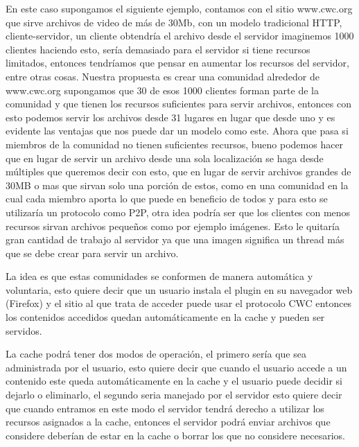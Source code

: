 En este caso supongamos el siguiente ejemplo, contamos con el sitio www.cwc.org que sirve archivos de video de más de 30Mb, con un modelo tradicional HTTP, cliente-servidor, un cliente obtendría el archivo desde el servidor  imaginemos 1000 clientes haciendo esto, sería demasiado para el servidor si tiene recursos limitados, entonces tendríamos que pensar en aumentar los recursos del servidor, entre otras cosas. Nuestra propuesta es crear una comunidad alrededor de www.cwc.org supongamos que 30 de esos 1000 clientes forman parte de la comunidad y que tienen los recursos suficientes para servir archivos, entonces con esto podemos servir los archivos desde 31 lugares en lugar que desde uno y es evidente las ventajas que nos puede dar un modelo como este. Ahora que pasa si miembros de la comunidad no tienen suficientes recursos, bueno podemos hacer que en lugar de servir un archivo desde una sola localización se haga desde múltiples que queremos decir con esto, que en lugar de servir archivos grandes de 30MB o mas que sirvan solo una porción de estos, como en una comunidad en la cual cada miembro aporta lo que puede en beneficio de todos y para esto se utilizaría un protocolo como P2P, otra idea podría ser que los clientes con menos recursos sirvan archivos pequeños como por ejemplo imágenes. Esto le quitaría gran cantidad de trabajo al servidor ya que una imagen significa un thread más que se debe crear para servir un archivo.

La idea es que estas comunidades se conformen de manera automática y voluntaria, esto quiere decir que un usuario instala el plugin en su navegador web (Firefox) y el sitio al que trata de acceder puede usar el protocolo CWC entonces los contenidos accedidos quedan automáticamente en la cache y pueden ser servidos.

La cache podrá tener dos modos de operación, el primero sería que sea administrada por el usuario, esto quiere decir que cuando el usuario accede a un contenido este queda automáticamente en la cache y el usuario puede decidir si dejarlo o eliminarlo, el segundo seria manejado por el servidor esto quiere decir que cuando entramos en este modo el servidor tendrá derecho a utilizar los recursos asignados a la cache, entonces el servidor podrá enviar archivos que considere deberían de estar en la cache o borrar los que no considere necesarios.


